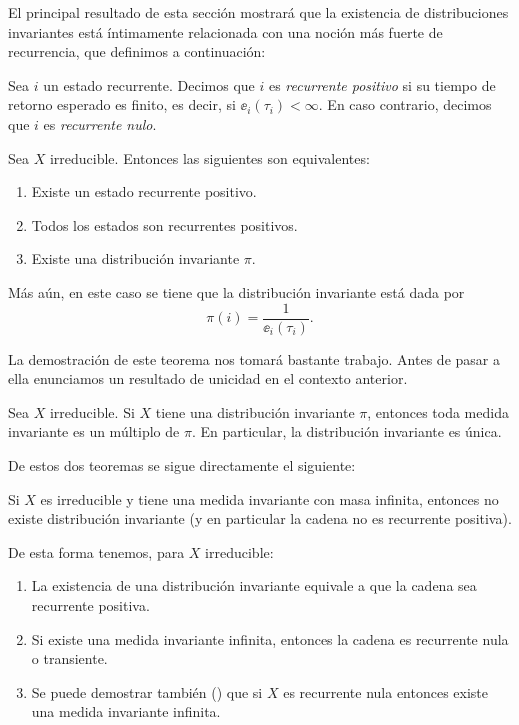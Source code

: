 El principal resultado de esta sección mostrará que la existencia de distribuciones invariantes está íntimamente relacionada con una noción más fuerte de recurrencia, que definimos a continuación:

\begin{defn}
Sea $i$ un estado recurrente.
Decimos que $i$ es \emph{recurrente positivo} si su tiempo de retorno esperado es finito, es decir, si $\ee_i(\tau_i)<\infty$.
En caso contrario, decimos que $i$ es \emph{recurrente nulo}.
\end{defn}

\begin{thm}\label{thm:ex-inv}
Sea $X$ irreducible.
Entonces las siguientes son equivalentes:
\begin{enumerate}[label=\uptext{(\roman*)}]
\item Existe un estado recurrente positivo.
\item Todos los estados son recurrentes positivos.
\item Existe una distribución invariante $\pi$.
\end{enumerate}
Más aún, en este caso se tiene que la distribución invariante está dada por
\begin{equation}
\pi(i)=\frac{1}{\ee_i(\tau_i)}.\label{eq:inv-form}
\end{equation}
\end{thm}

La demostración de este teorema nos tomará bastante trabajo.
Antes de pasar a ella enunciamos un resultado de unicidad en el contexto anterior.

\begin{thm}\label{thm:uniq-inv}
Sea $X$ irreducible.
Si $X$ tiene una distribución invariante $\pi$, entonces toda medida invariante es un múltiplo de $\pi$.
En particular, la distribución invariante es única.
\end{thm}

De estos dos teoremas se sigue directamente el siguiente:

\begin{cor}\label{cor:irrednorecpos}
Si $X$ es irreducible y tiene una medida invariante con masa infinita, entonces no existe distribución invariante (y en particular la cadena no es recurrente positiva).
\end{cor}

De esta forma tenemos, para $X$ irreducible:
\begin{enumerate}[label=\arabic*.]
\item La existencia de una distribución invariante equivale a que la cadena sea recurrente positiva.
\item Si existe una medida invariante infinita, entonces la cadena es recurrente nula o transiente.
\item Se puede demostrar también (\ucmark) que si $X$ es recurrente nula entonces existe una medida invariante infinita.
\end{enumerate}

